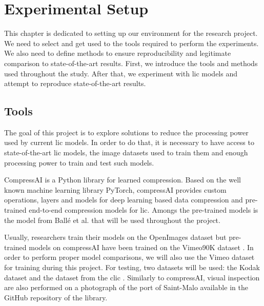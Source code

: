 \chapter{Experimental Setup}
\label{part_1}
This chapter is dedicated to setting up our environment for the research project. We need to select and get used to the tools required to perform the experiments. We also need to define methods to ensure reproducibility and legitimate comparison to state-of-the-art results. First, we introduce the tools and methods used throughout the study. After that, we experiment with \acrshort{lic} models and attempt to reproduce state-of-the-art results.

\section{Tools}
The goal of this project is to explore solutions to reduce the processing power used by current \acrshort{lic} models. In order to do that, it is necessary to have access to state-of-the-art \acrshort{lic} models, the image datasets used to train them and enough processing power to train and test such models.

CompressAI \cite{compressai} is a Python library for learned compression. Based on the well known machine learning library PyTorch, compressAI provides custom operations, layers and models for deep learning based data compression and pre-trained end-to-end compression models for \acrshort{lic}. Amongs the pre-trained models is the model from Ballé et al. \cite{ballé2018variationalimagecompressionscale} that will be used throughout the project.

Usually, researchers train their models on the OpenImages dataset \cite{openimages} but pre-trained models on compressAI have been trained on the Vimeo90K dataset \cite{xue2019video}. In order to perform proper model comparisons, we will also use the Vimeo dataset for training during this project. For testing, two datasets will be used: the Kodak dataset \cite{kodak} and the dataset from the \acrfull{clic} \cite{clic}. Similarly to compressAI, visual inspection are also performed on a photograph of the port of Saint-Malo available in the GitHub repository of the library.

